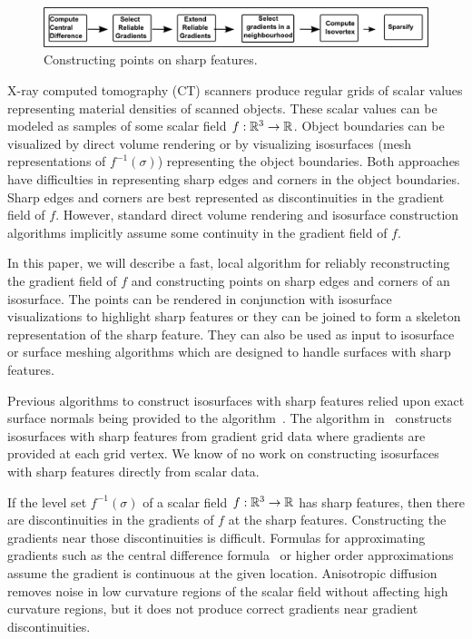 
\begin{figure}
    \centering
            \includegraphics[width=\linewidth]{images/flowchartCrop3.eps}
\caption{Constructing points on sharp features.}
\label{fig:flowchart}
\end{figure}



X-ray computed tomography (CT) scanners produce regular grids
of scalar values representing material densities of scanned objects.
These scalar values can be modeled as samples of some scalar field
$f:\mathbb{R}^{3} \rightarrow \mathbb{R}$.
Object boundaries can be visualized by direct volume rendering
or by visualizing isosurfaces (mesh representations of $f^{-1}(\sigma)$)
representing the object boundaries.
Both approaches have difficulties in representing sharp edges and corners
in the object boundaries.
Sharp edges and corners are best represented
as discontinuities in the gradient field of $f$.
However, standard direct volume rendering 
and isosurface construction algorithms implicitly assume
some continuity in the gradient field of $f$.

In this paper,
we will describe a fast, local algorithm for reliably reconstructing
the gradient field of $f$ 
and constructing points on sharp edges and corners of an isosurface.
The points can be rendered in conjunction with isosurface visualizations
to highlight sharp features or
they can be joined to form a skeleton representation of the sharp feature.
They can also be used as input to isosurface or surface meshing algorithms
which are designed to handle surfaces with sharp features.

Previous algorithms to construct isosurfaces with sharp features
relied upon exact surface normals being provided 
to the algorithm~\cite{
ab-fpmmo-03,gk-eretm-04,hwco-cmsaf-05,jlsw-dchd-02,
kbsh-fssev-01,ms-ispmg-10,Varadhan:2003:fss,sw-dmcpc-04,zhk-dctps-04}.
The algorithm in~\cite{bw-cisec-13}
constructs isosurfaces with sharp features
from gradient grid data
where gradients are provided at each grid vertex.
We know of no work on constructing isosurfaces with sharp features
directly from scalar data.

If the level set $f^{-1}(\sigma)$ of a scalar field
$f:\mathbb{R}^{3} \rightarrow \mathbb{R}$ has sharp features,
then there are discontinuities in the gradients of $f$
at the sharp features.
Constructing the gradients near those discontinuities
is difficult.
Formulas for approximating gradients
such as the central difference formula~\cite{ck-nmc-07}
or higher order approximations~\cite{aml-ger-10,ham-thqge-11,mmmy-cnes-97}
assume the gradient is continuous at the given location.
Anisotropic diffusion~\cite{
bx-adsfs-03,cdr-agdsp-00,twbo-gssad-02,twbo-gspnm-03,tw-adsnf-03} 
removes noise in low curvature regions of the scalar field 
without affecting high curvature regions,
but it does not produce correct gradients near gradient discontinuities.

